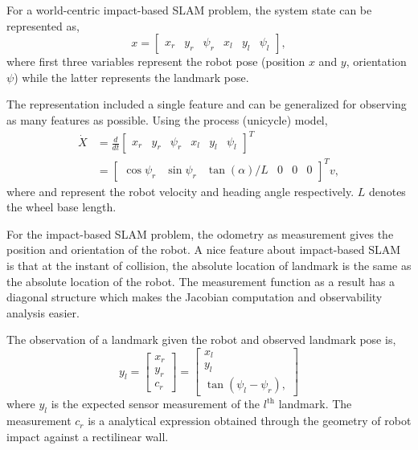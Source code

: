 For a world-centric impact-based SLAM problem, the system state can be represented as,
\begin{equation}
x=\begin{bmatrix}x_r & y_r & \psi_r & x_l & y_l & \psi_l\end{bmatrix},
\end{equation} 
where first three variables represent the robot pose (position $x$ and $y$, orientation $\psi$) while the latter represents the landmark pose.

The representation included a single feature and can be generalized for observing as many features as possible. Using the process (unicycle) model,
\begin{align}
\dot{X}&=\frac{d}{dt}\begin{bmatrix}x_r & y_r & \psi_r & x_l & y_l & \psi_l\end{bmatrix}^ T \nonumber \\
&=\begin{bmatrix}\cos\psi_r & \sin\psi_r & \tan(\alpha)/L & 0 & 0 & 0 \end{bmatrix}^Tv, \label{proc_model}
\end{align}
where  and  represent the robot velocity and heading angle respectively. $L$ denotes the wheel base length.

For the impact-based SLAM problem, the odometry as measurement gives the position and orientation of the robot. A nice feature about impact-based SLAM is that at the instant of collision, the absolute location of landmark is the same as the absolute location of the robot. The measurement function as a result has a diagonal structure which makes the Jacobian computation and observability analysis easier.

The observation of a landmark given the robot and observed landmark pose is,
\begin{equation}
y_l = \begin{bmatrix}x_r \\ y_r \\ c_r\end{bmatrix} = \begin{bmatrix}
x_l \\ y_l \\ \tan(\psi_l-\psi_r),
\end{bmatrix}
\label{measurement_eq}
\end{equation}
where $y_l$ is the expected sensor measurement of the $l^{\text{th}}$ landmark. The measurement $c_r$ is a analytical expression obtained through the geometry of robot impact against a rectilinear wall.

